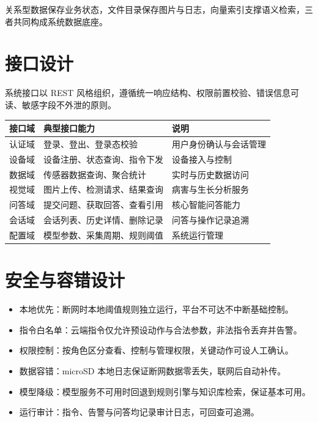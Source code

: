 \documentclass[11pt]{ctexart}
\begin{document}
关系型数据保存业务状态，文件目录保存图片与日志，向量索引支撑语义检索，三者共同构成系统数据底座。

\section{接口设计}
系统接口以 REST 风格组织，遵循统一响应结构、权限前置校验、错误信息可读、敏感字段不外泄的原则。

\begin{longtable}{p{2.6cm}p{5.2cm}p{7.0cm}}
  \toprule
  接口域 & 典型接口能力 & 说明 \\
  \midrule
  认证域 & 登录、登出、登录态校验 & 用户身份确认与会话管理 \\
  设备域 & 设备注册、状态查询、指令下发 & 设备接入与控制 \\
  数据域 & 传感器数据查询、聚合统计 & 实时与历史数据访问 \\
  视觉域 & 图片上传、检测请求、结果查询 & 病害与生长分析服务 \\
  问答域 & 提交问题、获取回答、查看引用 & 核心智能问答能力 \\
  会话域 & 会话列表、历史详情、删除记录 & 问答与操作记录追溯 \\
  配置域 & 模型参数、采集周期、规则阈值 & 系统运行管理 \\
  \bottomrule
\end{longtable}

\section{安全与容错设计}
\begin{itemize}
  \item 本地优先：断网时本地阈值规则独立运行，平台不可达不中断基础控制。
  \item 指令白名单：云端指令仅允许预设动作与合法参数，非法指令丢弃并告警。
  \item 权限控制：按角色区分查看、控制与管理权限，关键动作可设人工确认。
  \item 数据容错：microSD 本地日志保证断网数据零丢失，联网后自动补传。
  \item 模型降级：模型服务不可用时回退到规则引擎与知识库检索，保证基本可用。
  \item 运行审计：指令、告警与问答均记录审计日志，可回查可追溯。
\end{itemize}
\end{document}
